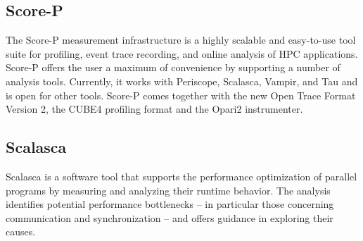 \subsection{Score-P}
\label{sec:scorep}
The Score-P measurement infrastructure is a highly scalable and easy-to-use tool suite for profiling, event trace recording, and online analysis of HPC applications. Score-P offers the user a maximum of convenience by supporting a number of analysis tools. Currently, it works with Periscope, Scalasca, Vampir, and Tau and is open for other tools. Score-P comes together with the new Open Trace Format Version 2, the CUBE4 profiling format and the Opari2 instrumenter.  \cite{scorep}

\subsection{Scalasca}
\label{appendix:scalasca}
Scalasca is a software tool that supports the performance optimization of parallel programs by measuring and analyzing their runtime behavior. The analysis identifies potential performance bottlenecks – in particular those concerning communication and synchronization – and offers guidance in exploring their causes. \cite{scalasca}
